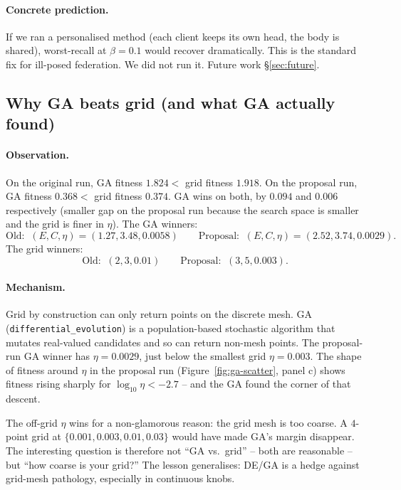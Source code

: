\paragraph{Concrete prediction.} If we ran a personalised method (each client
keeps its own head, the body is shared), worst-recall at $\beta\!=\!0.1$ would
recover dramatically. This is the standard fix for ill-posed federation. We
did not run it. Future work \S\ref{sec:future}.

\subsection{Why GA beats grid (and what GA actually found)}
\label{sec:mechanism-search}

\paragraph{Observation.} On the original run, GA fitness $1.824 < $ grid fitness
$1.918$. On the proposal run, GA fitness $0.368 < $ grid fitness $0.374$. GA
wins on both, by $0.094$ and $0.006$ respectively (smaller gap on the proposal
run because the search space is smaller and the grid is finer in $\eta$).
The GA winners:
\[
\text{Old:}\;\;(E,C,\eta) = (1.27, 3.48, 0.0058) \qquad
\text{Proposal:}\;\;(E,C,\eta) = (2.52, 3.74, 0.0029).
\]
The grid winners:
\[
\text{Old:}\;\;(2,3,0.01) \qquad
\text{Proposal:}\;\;(3,5,0.003).
\]

\paragraph{Mechanism.} Grid by construction can only return points on the
discrete mesh. GA (\texttt{differential\_evolution}) is a population-based
stochastic algorithm that mutates real-valued candidates and so can return
non-mesh points. The proposal-run GA winner has $\eta\!=\!0.0029$, just below
the smallest grid $\eta\!=\!0.003$. The shape of fitness around $\eta$ in the
proposal run (Figure~\ref{fig:ga-scatter}, panel c) shows fitness rising
sharply for $\log_{10}\eta < -2.7$ -- and the GA found the corner of that
descent.

The off-grid $\eta$ wins for a non-glamorous reason: the grid mesh is too
coarse. A $4$-point grid at $\{0.001, 0.003, 0.01, 0.03\}$ would have made GA's
margin disappear. The interesting question is therefore not ``GA vs.\ grid'' --
both are reasonable -- but ``how coarse is your grid?'' The lesson generalises:
DE/GA is a hedge against grid-mesh pathology, especially in continuous knobs.

